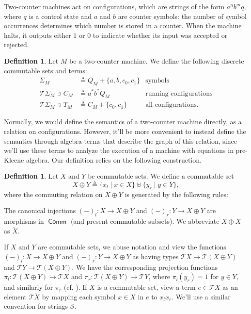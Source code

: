 \documentclass[11pt,a4paper]{amsart}
\theoremstyle{definition}
\newtheorem{definition}[theorem]{Definition}
\DeclareMathOperator{\Comm}{\mathsf{Comm}}
\begin{document}
Two-counter machines act on configurations, which are strings of the form
$a^nb^mq$, where $q$ is a control state and $a$ and $b$ are counter symbols: the
number of symbol occurrences determines which number is stored in a counter.
When the machine halts, it outputs either $1$ or $0$ to indicate whether its
input was accepted or rejected.

\begin{definition}
  \label{def:configurations}
  Let $M$ be a two-counter machine.  We define the following discrete commutable
  sets and terms:
  \begin{align*}
     \Sigma _M &  \triangleq  Q_M + \{a,b,c_0,c_1\} & \text{symbols} \\
    \mathcal{T} \Sigma _M  \ni  C_M &  \triangleq  a^*b^*Q_M & \text{running configurations} \\
    \mathcal{T} \Sigma _M  \ni  T_M &  \triangleq  C_M + \{c_0,c_1\} & \text{all configurations}.
  \end{align*}
\end{definition}

Normally, we would define the semantics of a two-counter machine directly, as a
relation on configurations.  However, it'll be more convenient to instead define
the semantics through algebra terms that describe the graph of this relation,
since we'll use these terms to analyze the execution of a machine with equations
in pre-Kleene algebra. Our definition relies on the following construction.

\begin{definition}
  Let $X$ and $Y$ be commutable sets.  We define a commutable set
  \[ X  \oplus  Y  \triangleq  \{ x_l  \mid  x  \in  X \}  \uplus  \{y_r  \mid  y  \in  Y \}, \] where the commuting
  relation on $X  \oplus  Y$ is generated by the following rules:
  The canonical injections $(-)_l : X \to X \oplus Y$ and
  $(-)_r : Y \to X \oplus Y$ are morphisms in $\Comm$ (and present commutable
  subsets).  We abbreviate $X \oplus X$ as $\ddot{X}$.
\end{definition}

If $X$ and $Y$ are commutable sets, we abuse notation and view the functions
$(-)_l : X  \to  X  \oplus  Y$ and $(-)_r : Y  \to  X  \oplus  Y$ as having types
$\mathcal{T}X  \to  \mathcal{T}(X  \oplus  Y)$ and $\mathcal{T}Y  \to  \mathcal{T}(X  \oplus  Y)$.  We
have the corresponding projection functions
$ \pi _l : \mathcal{T}(X  \oplus  Y)  \to  \mathcal{T}X$ and
$ \pi _r : \mathcal{T}(X  \oplus  Y)  \to  \mathcal{T}Y$, where $ \pi _l(y_r) = 1$ for $y  \in  Y$, and
similarly for $ \pi _r$ (cf. ).  If $X$ is a commutable set,
view a term $e  \in  \mathcal{T}X$ as an element $\mathcal{T}\ddot{X}$ by mapping
each symbol $x  \in  X$ in $e$ to $x_lx_r$.  We'll use a similar convention for
strings $\mathcal{S}$.
\end{document}
